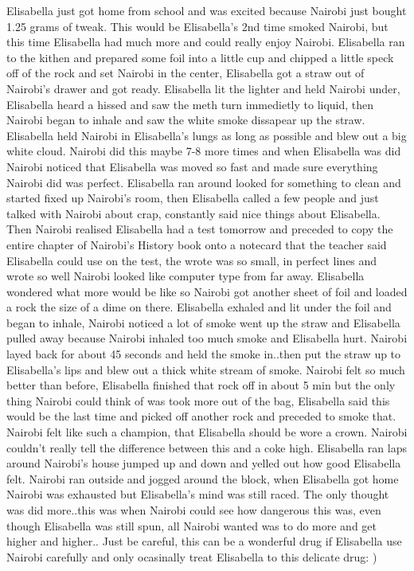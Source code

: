 \documentclass[12pt]{book}
\begin{document}
Elisabella just got home from school and was excited because Nairobi just bought 1.25 grams of tweak. This would be Elisabella's 2nd time smoked Nairobi, but this time Elisabella had much more and could really enjoy Nairobi. Elisabella ran to the kithen and prepared some foil into a little cup and chipped a little speck off of the rock and set Nairobi in the center, Elisabella got a straw out of Nairobi's drawer and got ready. Elisabella lit the lighter and held Nairobi under, Elisabella heard a hissed and saw the meth turn immedietly to liquid, then Nairobi began to inhale and saw the white smoke dissapear up the straw. Elisabella held Nairobi in Elisabella's lungs as long as possible and blew out a big white cloud. Nairobi did this maybe 7-8 more times and when Elisabella was did Nairobi noticed that Elisabella was moved so fast and made sure everything Nairobi did was perfect. Elisabella ran around looked for something to clean and started fixed up Nairobi's room, then Elisabella called a few people and just talked with Nairobi about crap, constantly said nice things about Elisabella. Then Nairobi realised Elisabella had a test tomorrow and preceded to copy the entire chapter of Nairobi's History book onto a notecard that the teacher said Elisabella could use on the test, the wrote was so small, in perfect lines and wrote so well Nairobi looked like computer type from far away. Elisabella wondered what more would be like so Nairobi got another sheet of foil and loaded a rock the size of a dime on there. Elisabella exhaled and lit under the foil and began to inhale, Nairobi noticed a lot of smoke went up the straw and Elisabella pulled away because Nairobi inhaled too much smoke and Elisabella hurt. Nairobi layed back for about 45 seconds and held the smoke in..then put the straw up to Elisabella's lips and blew out a thick white stream of smoke. Nairobi felt so much better than before, Elisabella finished that rock off in about 5 min but the only thing Nairobi could think of was took more out of the bag, Elisabella said this would be the last time and picked off another rock and preceded to smoke that. Nairobi felt like such a champion, that Elisabella should be wore a crown. Nairobi couldn't really tell the difference between this and a coke high. Elisabella ran laps around Nairobi's house jumped up and down and yelled out how good Elisabella felt. Nairobi ran outside and jogged around the block, when Elisabella got home Nairobi was exhausted but Elisabella's mind was still raced. The only thought was did more..this was when Nairobi could see how dangerous this was, even though Elisabella was still spun, all Nairobi wanted was to do more and get higher and higher.. Just be careful, this can be a wonderful drug if Elisabella use Nairobi carefully and only ocasinally treat Elisabella to this delicate drug: )
\end{document}
